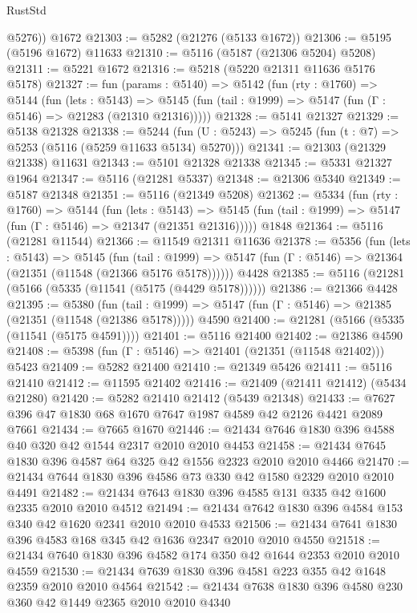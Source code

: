 \begin{lexlean}{RustStd}
\begin{coremodule}
        @5276))
    @1672
@21303 := @5282 (@21276 (@5133 @1672))
@21306 := @5195 (@5196 @1672) @11633
@21310 := @5116 (@5187 (@21306 @5204) @5208)
@21311 := @5221 @1672
@21316 := @5218 (@5220 @21311 @11636 @5176 @5178)
@21327 := fun (params : @5140) =>
  @5142
    (fun (rty : @1760) =>
    @5144
      (fun (lets : @5143) =>
      @5145 (fun (tail : @1999) => @5147 (fun (Γ : @5146) => @21283 (@21310 @21316)))))
@21328 := @5141 @21327
@21329 := @5138 @21328
@21338 := @5244
    (fun (U : @5243) => @5245 (fun (t : @7) => @5253 (@5116 (@5259 @11633 @5134) @5270)))
@21341 := @21303 (@21329 @21338) @11631
@21343 := @5101 @21328 @21338
@21345 := @5331 @21327 @1964
@21347 := @5116 (@21281 @5337)
@21348 := @21306 @5340
@21349 := @5187 @21348
@21351 := @5116 (@21349 @5208)
@21362 := @5334
    (fun (rty : @1760) =>
    @5144
      (fun (lets : @5143) =>
      @5145 (fun (tail : @1999) => @5147 (fun (Γ : @5146) => @21347 (@21351 @21316)))))
    @1848
@21364 := @5116 (@21281 @11544)
@21366 := @11549 @21311 @11636
@21378 := @5356
    (fun (lets : @5143) =>
    @5145
      (fun (tail : @1999) =>
      @5147 (fun (Γ : @5146) => @21364 (@21351 (@11548 (@21366 @5176 @5178))))))
    @4428
@21385 := @5116 (@21281 (@5166 (@5335 (@11541 (@5175 (@4429 @5178))))))
@21386 := @21366 @4428
@21395 := @5380
    (fun (tail : @1999) => @5147 (fun (Γ : @5146) => @21385 (@21351 (@11548 (@21386 @5178)))))
    @4590
@21400 := @21281 (@5166 (@5335 (@11541 (@5175 @4591))))
@21401 := @5116 @21400
@21402 := @21386 @4590
@21408 := @5398 (fun (Γ : @5146) => @21401 (@21351 (@11548 @21402))) @5423
@21409 := @5282 @21400
@21410 := @21349 @5426
@21411 := @5116 @21410
@21412 := @11595 @21402
@21416 := @21409 (@21411 @21412) (@5434 @21280)
@21420 := @5282 @21410 @21412 (@5439 @21348)
@21433 := @7627 @396 @47 @1830 @68 @1670 @7647 @1987 @4589 @42 @2126 @4421 @2089 @7661
@21434 := @7665 @1670
@21446 := @21434 @7646 @1830 @396 @4588 @40 @320 @42 @1544 @2317 @2010 @2010 @4453
@21458 := @21434 @7645 @1830 @396 @4587 @64 @325 @42 @1556 @2323 @2010 @2010 @4466
@21470 := @21434 @7644 @1830 @396 @4586 @73 @330 @42 @1580 @2329 @2010 @2010 @4491
@21482 := @21434 @7643 @1830 @396 @4585 @131 @335 @42 @1600 @2335 @2010 @2010 @4512
@21494 := @21434 @7642 @1830 @396 @4584 @153 @340 @42 @1620 @2341 @2010 @2010 @4533
@21506 := @21434 @7641 @1830 @396 @4583 @168 @345 @42 @1636 @2347 @2010 @2010 @4550
@21518 := @21434 @7640 @1830 @396 @4582 @174 @350 @42 @1644 @2353 @2010 @2010 @4559
@21530 := @21434 @7639 @1830 @396 @4581 @223 @355 @42 @1648 @2359 @2010 @2010 @4564
@21542 := @21434 @7638 @1830 @396 @4580 @230 @360 @42 @1449 @2365 @2010 @2010 @4340

\end{coremodule}
\end{lexlean}
